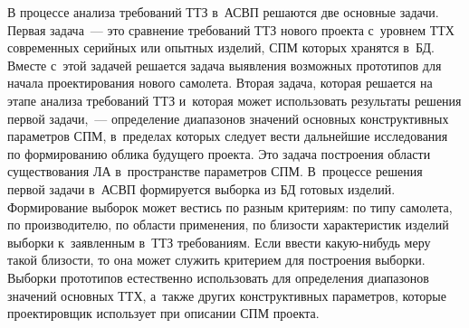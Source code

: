 \begin{multicols}{2}
   В процессе анализа требований ТТЗ в~\mbox{АСВП} решаются две основные задачи. 
Первая задача~--- это сравнение требований ТТЗ нового проекта с~уровнем 
ТТХ современных серийных или опытных 
изделий, СПМ которых хранятся в~БД. Вмес\-те с~этой задачей решается задача 
выявления воз\-мож\-ных прототипов для начала проектирования нового самолета. 
Вторая задача, которая решается на этапе анализа требований ТТЗ и~которая 
может использовать результаты решения первой задачи,~--- определение 
диапазонов значений основных конструктивных па\-ра\-мет\-ров СПМ, в~пределах 
которых следует вести дальнейшие исследования по формированию облика 
будущего проекта. Это задача по\-стро\-ения об\-ласти существования ЛА 
в~пространстве па\-ра\-мет\-ров СПМ. В~процессе решения первой задачи в~\mbox{АСВП} 
формируется выборка из БД готовых изделий. Формирование выборок может 
вестись по разным критериям: по типу самолета, по производителю, по  
об\-ласти применения, по бли\-зости характеристик изделий выборки 
к~заявленным в~ТТЗ требованиям. Если ввести ка\-кую-ни\-будь меру такой 
бли\-зости, то она может служить критерием для по\-стро\-ения вы\-бор\-ки. Вы\-бор\-ки 
прототипов естественно использовать для определения диапазонов значений 
основных ТТХ, а~так\-же других конструктивных 
па\-ра\-мет\-ров, которые проектировщик использует при описании СПМ проекта.
  

\end{multicols}
